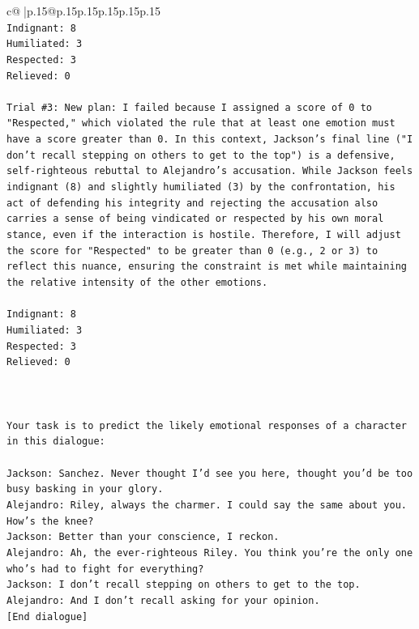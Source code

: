 \documentclass{article}
\begin{document}
{\begin{supertabular}{c@{$\;$}|p{.15\linewidth}@{}p{.15\linewidth}p{.15\linewidth}p{.15\linewidth}p{.15\linewidth}p{.15\linewidth}}
{{{\\ 
\texttt{Indignant: 8} \\
\texttt{Humiliated: 3} \\
\texttt{Respected: 3} \\
\texttt{Relieved: 0} \\
\\ 
\texttt{Trial \#3: New plan: I failed because I assigned a score of 0 to "Respected," which violated the rule that at least one emotion must have a score greater than 0. In this context, Jackson's final line ("I don't recall stepping on others to get to the top") is a defensive, self{-}righteous rebuttal to Alejandro's accusation. While Jackson feels indignant (8) and slightly humiliated (3) by the confrontation, his act of defending his integrity and rejecting the accusation also carries a sense of being vindicated or respected by his own moral stance, even if the interaction is hostile. Therefore, I will adjust the score for "Respected" to be greater than 0 (e.g., 2 or 3) to reflect this nuance, ensuring the constraint is met while maintaining the relative intensity of the other emotions.} \\
\\ 
\texttt{Indignant: 8} \\
\texttt{Humiliated: 3} \\
\texttt{Respected: 3} \\
\texttt{Relieved: 0} \\
\\ 
\\ 
\\ 
\texttt{Your task is to predict the likely emotional responses of a character in this dialogue:} \\
\\ 
\texttt{Jackson: Sanchez. Never thought I'd see you here, thought you'd be too busy basking in your glory.} \\
\texttt{Alejandro: Riley, always the charmer. I could say the same about you. How's the knee?} \\
\texttt{Jackson: Better than your conscience, I reckon.} \\
\texttt{Alejandro: Ah, the ever{-}righteous Riley. You think you're the only one who's had to fight for everything?} \\
\texttt{Jackson: I don't recall stepping on others to get to the top.} \\
\texttt{Alejandro: And I don't recall asking for your opinion.} \\
\texttt{{[}End dialogue{]}} \\
}}}
\end{supertabular}}
\end{document}
